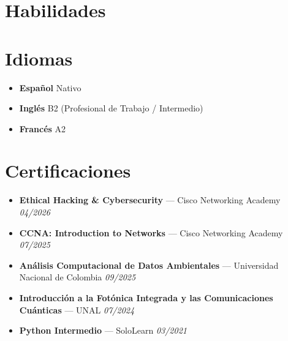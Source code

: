 \documentclass[11pt,a4paper]{article}
\begin{document}
\section{Habilidades}
\begin{tcolorbox}[colback=lightgray, colframe=lightgray, boxrule=0pt, arc=6pt, left=10pt, right=10pt, top=10pt, bottom=10pt]
\noindent
\linespread{1.8}\selectfont
{}
\end{tcolorbox}

\section{Idiomas}
\begin{itemize}[label={}, leftmargin=0.3cm, itemsep=6pt]
    \item \textbf{Español} \hfill Nativo \quad \textcolor{accent}{\faCircle \faCircle \faCircle \faCircle \faCircle}
    \item \textbf{Inglés} \hfill B2 (Profesional de Trabajo / Intermedio) \quad \textcolor{accent}{\faCircle \faCircle \faCircle \faCircle} \textcolor{bulletline}{\faCircle}
    \item \textbf{Francés} \hfill A2 \quad \textcolor{accent}{\faCircle \faCircle} \textcolor{bulletline}{\faCircle \faCircle \faCircle}
\end{itemize}

\section{Certificaciones}
\begin{itemize}[label={\color{accentblue}\faAward}, leftmargin=0.6cm, itemsep=6pt]
    \item \textbf{Ethical Hacking \& Cybersecurity} --- Cisco Networking Academy \hfill \textit{04/2026}
    \item \textbf{CCNA: Introduction to Networks} --- Cisco Networking Academy \hfill \textit{07/2025}
    \item \textbf{Análisis Computacional de Datos Ambientales} --- Universidad Nacional de Colombia \hfill \textit{09/2025}
    \item \textbf{Introducción a la Fotónica Integrada y las Comunicaciones Cuánticas} --- UNAL \hfill \textit{07/2024}
    \item \textbf{Python Intermedio} --- SoloLearn \hfill \textit{03/2021}
\end{itemize}
\end{document}
